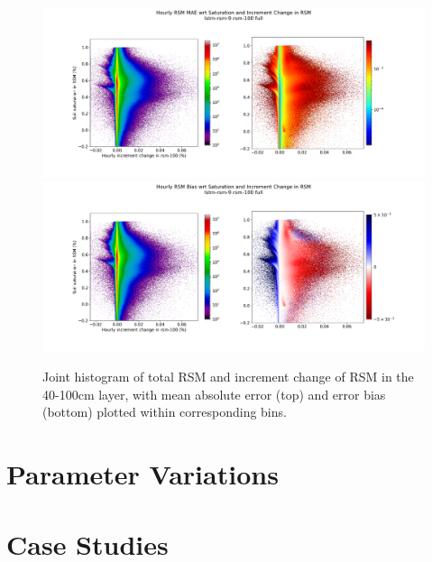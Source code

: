 \begin{figure}[hp!]
    \centering

    \includegraphics[width=.96\linewidth,draft=false]{figures/grid-eval_lstm-rsm-9_full/eval-grid_full_lstm-rsm-9_rsm-100_hist-state-increment_abs-err.png}
    \includegraphics[width=.96\linewidth,draft=false]{figures/grid-eval_lstm-rsm-9_full/eval-grid_full_lstm-rsm-9_rsm-100_hist-state-increment_bias.png}

    \caption{Joint histogram of total RSM and increment change of RSM in the 40-100cm layer, with mean absolute error (top) and error bias (bottom) plotted within corresponding bins.}
    \label{acclstm-rsm-9-sihist-rsm-100}
\end{figure}

\section{Parameter Variations}

\section{Case Studies}

